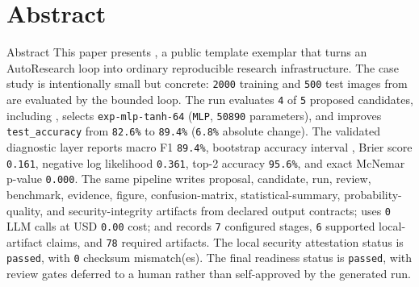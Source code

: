 \documentclass[
  ignorenonframetext,
]{beamer}
\author{\texorpdfstring{}{}}
\date{}
\begin{document}
\section{Abstract}\label{sec:abstract}

\begin{frame}{Abstract}
This paper presents
,
a public template exemplar that turns an AutoResearch loop into ordinary
reproducible research infrastructure. The case study is intentionally
small but concrete: \texttt{2000} training and \texttt{500} test images
from  are evaluated by the
bounded  loop. The
run evaluates \texttt{4} of \texttt{5} proposed candidates, including
, selects
\texttt{exp-mlp-tanh-64} (\texttt{MLP}, \texttt{50890} parameters), and
improves \texttt{test\_accuracy} from \texttt{82.6\%} to \texttt{89.4\%}
(\texttt{6.8\%} absolute change). The validated diagnostic layer reports
macro F1 \texttt{89.4\%}, bootstrap accuracy interval
, Brier score \texttt{0.161}, negative log
likelihood \texttt{0.361}, top-2 accuracy \texttt{95.6\%}, and exact
McNemar p-value \texttt{0.000}. The same pipeline writes proposal,
candidate, run, review, benchmark, evidence, figure, confusion-matrix,
statistical-summary, probability-quality, and security-integrity
artifacts from declared output contracts; uses \texttt{0} LLM calls at
USD \texttt{0.00} cost; and records \texttt{7} configured stages,
\texttt{6} supported local-artifact claims, and \texttt{78} required
artifacts. The local security attestation status is \texttt{passed},
with \texttt{0} checksum mismatch(es). The final readiness status is
\texttt{passed}, with review gates deferred to a human rather than
self-approved by the generated run.
\end{frame}
\end{document}
